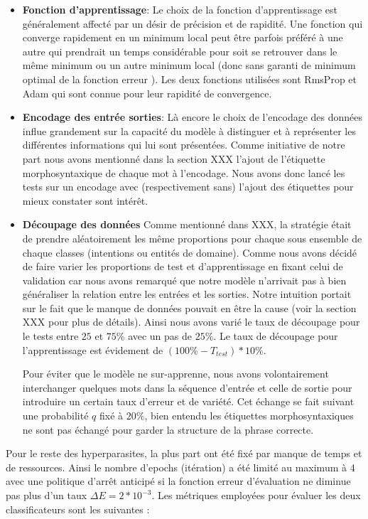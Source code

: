 \begin{itemize}
		\item \textbf{Fonction d'apprentissage}:
		Le choix de la fonction d'apprentissage est généralement affecté par un désir de précision et de rapidité. Une fonction qui converge rapidement en un minimum local peut être parfois préféré à une autre qui prendrait un temps considérable pour soit se retrouver dans le même minimum ou un autre minimum local (donc sans garanti de minimum optimal de la fonction erreur ). Les deux fonctions utilisées sont RmsProp et Adam qui sont connue pour leur rapidité de convergence.
		
		\item \textbf{Encodage des entrée sorties}:
		Là encore le choix de l'encodage des données influe grandement sur la capacité du modèle à distinguer et à représenter les différentes informations qui lui sont présentées. Comme initiative de notre part nous avons mentionné dans la section XXX l'ajout de l'étiquette morphosyntaxique de chaque mot à l'encodage. Nous avons donc lancé les tests sur un encodage avec (respectivement sans) l'ajout des étiquettes pour mieux constater sont intérêt.
		
		\item \textbf{Découpage des données}
		Comme mentionné dans XXX, la stratégie était de prendre aléatoirement les même proportions pour chaque sous ensemble de chaque classes (intentions ou entités de domaine). Comme nous avons décidé de faire varier les proportions de test et d'apprentissage en fixant celui de validation car nous avons remarqué que notre modèle n'arrivait pas à bien généraliser la relation entre les entrées et les sorties. Notre intuition portait sur le fait que le manque de données pouvait en être la cause (voir la section XXX pour plus de détails). Ainsi nous avons varié le taux de découpage pour le tests entre $25$ et $75\%$ avec un pas de $25\%$. Le taux de découpage pour l'apprentissage est évidement de $(100\%-T_{test})*10\%$.
		\par
		Pour éviter que le modèle ne sur-apprenne, nous avons volontairement interchanger quelques mots dans la séquence d'entrée et celle de sortie pour introduire un certain taux d'erreur et de variété. Cet échange se fait suivant une probabilité $q$ fixé à $20\%$, bien entendu les étiquettes morphosyntaxiques ne sont pas échangé pour garder la structure de la phrase correcte.
	\end{itemize}
	\par
	Pour le reste des hyperparasites, la plus part ont été fixé par manque de temps et de ressources. Ainsi le nombre d'epochs (itération) a été limité au maximum à 4 avec une politique d'arrêt anticipé si la fonction erreur d'évaluation ne diminue pas plus d'un taux $\Delta E = 2*10^{-3}$. Les métriques employées pour évaluer les deux classificateurs sont les suivantes : 
